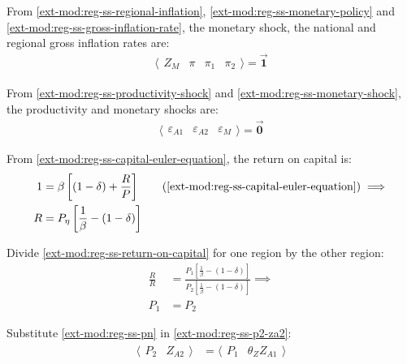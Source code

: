\documentclass[../thesis.tex]{subfiles}
\begin{document}
	From \ref{ext-mod:reg-ss-regional-inflation}, \ref{ext-mod:reg-ss-monetary-policy} and \ref{ext-mod:reg-ss-gross-inflation-rate}, the monetary shock, the national and regional gross inflation rates are:
	\begin{align}
		\langle \begin{matrix} Z_{M} & \pi & \pi_{1} & \pi_{2} \end{matrix} \rangle  = \vec{\bm{1}} \label{ext-mod:reg-ss-zm-pi}
	\end{align}
	
	From \ref{ext-mod:reg-ss-productivity-shock} and \ref{ext-mod:reg-ss-monetary-shock}, the productivity and monetary shocks are:
	\begin{align}
		\langle \begin{matrix} \varepsilon_{A1} & \varepsilon_{A2} & \varepsilon_{M} \end{matrix} \rangle = \vec{\bm{0}} \label{ext-mod:reg-ss-epsilon}
	\end{align}

	
	From \ref{ext-mod:reg-ss-capital-euler-equation}, the return on capital is:
	\begin{align}
		1 &= \beta \left[ (1 - \delta) + \frac{R}{P} \right] \tag{\ref{ext-mod:reg-ss-capital-euler-equation}} \implies \\
		R &= P_{\eta} \left[ \frac{1}{\beta} - (1- \delta) \right] \label{ext-mod:reg-ss-return-on-capital}
	\end{align}

Divide \ref{ext-mod:reg-ss-return-on-capital} for one region by the other region:
\begin{align}
	\frac{R}{R} &= \frac{P_{1} \left[ \frac{1}{\beta} - (1- \delta) \right]}{P_{2} \left[ \frac{1}{\beta} - (1- \delta) \right]} \implies \nonumber \\
	P_{1} &= P_{2} \label{ext-mod:reg-ss-pn}
\end{align}

Substitute \ref{ext-mod:reg-ss-pn} in \ref{ext-mod:reg-ss-p2-za2}:
\begin{align}
	\langle \begin{matrix} P_{2} & Z_{A2} \end{matrix} \rangle &= \langle \begin{matrix} P_{1} & \theta_{Z} Z_{A1} \end{matrix} \rangle \label{ext-mod:reg-ss-p2-za2-b}
\end{align}
\end{document}
